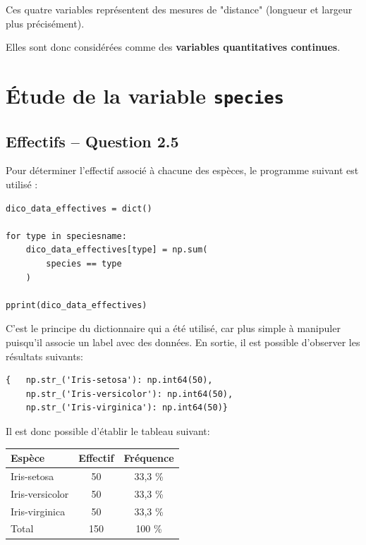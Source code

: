 \documentclass[12pt,a4paper]{article}
\begin{document}
Ces quatre variables représentent des mesures de "distance" (longueur et largeur plus précisément).

Elles sont donc considérées comme des
\textbf{variables quantitatives continues}.



\section{Étude de la variable \texttt{species}}

\subsection{Effectifs -- Question 2.5}

Pour déterminer l'effectif associé à chacune des espèces, le programme
suivant est utilisé :

\begin{lstlisting}
dico_data_effectives = dict()

for type in speciesname:
    dico_data_effectives[type] = np.sum(
        species == type
    )

pprint(dico_data_effectives)
\end{lstlisting}
C'est le principe du dictionnaire qui a été utilisé, car plus simple à manipuler puisqu'il associe un label avec des données. En sortie, il est possible d'observer les résultats suivants:

\begin{lstlisting}
{   np.str_('Iris-setosa'): np.int64(50),
    np.str_('Iris-versicolor'): np.int64(50),
    np.str_('Iris-virginica'): np.int64(50)}
\end{lstlisting}


Il est donc possible d'établir le tableau suivant:

\begin{center}
\begin{tabular}{lcc}
\toprule
\textbf{Espèce} & \textbf{Effectif} & \textbf{Fréquence} \\
\midrule
Iris-setosa     & 50 & 33,3 \% \\
Iris-versicolor & 50 & 33,3 \% \\
Iris-virginica  & 50 & 33,3 \% \\
\midrule
Total           & 150 & 100 \% \\
\bottomrule
\end{tabular}
\end{center}
\end{document}

